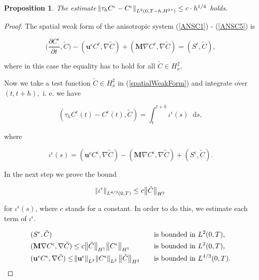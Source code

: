 \documentclass[11pt]{article}
\newtheorem{prop}{Proposition}
\newcommand*\diff{\mathop{}\!\mathrm{d}}
\begin{document}
\begin{prop}
The estimate $\norm{\tau_h C^\epsilon - C^\epsilon}_{L^2(0,T-h, {H^2}^*)} \leq c \cdot h^{1/4}$ holds.
\end{prop}

\begin{proof}
The spatial weak form of the anisotropic system (\ref{ANSC1}) - (\ref{ANSC5}) is

\begin{equation} \bigg (\frac{\partial C^\epsilon}{\partial t}, \tilde{C} \bigg ) - (\mathbf{u}^\epsilon C^\epsilon, \nabla \tilde{C}) + (\mathbf{M} \nabla C^\epsilon, \nabla \tilde{C}) = (S^\epsilon, \tilde{C}), \label{spatialWeakForm} \end{equation}

where in this case the equality has to hold for all $\tilde{C} \in H^2_x.$

Now we take a test function $\tilde{C} \in H^2_x$  in (\ref{spatialWeakForm}) and integrate over $(t, t+h),$ i. e. we have

\[ (\tau_h C^\epsilon (t) - C^\epsilon (t), \tilde{C}) = \int_t^{t+h} \iota^\epsilon (s) \diff s,\]

where

\[ \iota^\epsilon (s) = (\mathbf{u}^\epsilon C^\epsilon, \nabla \tilde{C}) - (\mathbf{M} \nabla C^\epsilon, \nabla \tilde{C}) + (S^\epsilon, \tilde{C}). \]

In the next step we prove the bound

\begin{equation} \norm{\iota^\epsilon}_{L^{4/3}(0,T)} \leq c \big \| \tilde{C} \big \| _{H^2} \label{bound_iota} \end{equation}

for $\iota^\epsilon(s)$, where $c$ stands for a constant. In order to do this, we estimate each term of $\iota^\epsilon.$

\begin{align} 
  &  (S^\epsilon, \tilde{C}) &\quad & \text{is bounded in $L^2(0,T)$,}  \\ 
  & \label{lineartermboundgradC} (\mathbf{M} \nabla C^\epsilon, \nabla \tilde{C}) \leq c \big \| \tilde{C} \big \| _{H^1} \big \| C^\epsilon \big \| _{H^1} &\quad & \text{is bounded in $L^2(0,T)$,}  \\
  & (\mathbf{u}^\epsilon C^\epsilon, \nabla \tilde{C}) \leq \norm{\mathbf{u}^\epsilon}_{L^2} \norm{C^\epsilon}_{L^3}  \big \| \tilde{C} \big \| _{H^2} &\quad & \text{is bounded in $L^{4/3}(0,T).$}
\end{align} 


\end{proof}
\end{document}
